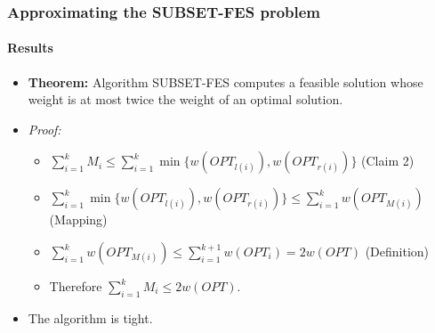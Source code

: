 \documentclass[10pt]{beamer}
\begin{document}
\begin{frame}
    \frametitle{Approximating the SUBSET-FES problem}
    \framesubtitle{Results}
    \begin{itemize}
        \item \textbf{Theorem:} Algorithm SUBSET-FES computes a feasible solution whose weight is at most twice the weight of an optimal solution.
        \item \textit{Proof:}
        \begin{itemize}
            \item \(\sum_{i=1}^{k}M_i \leq \sum_{i=1}^{k} \min\{w(OPT_{l(i)}), w(OPT_{r(i)})\}\) (Claim 2)
            \item \(\sum_{i=1}^{k} \min\{w(OPT_{l(i)}), w(OPT_{r(i)})\} \leq \sum_{i=1}^{k} w(OPT_{M(i)})\) (Mapping)
            \item \(\sum_{i=1}^{k} w(OPT_{M(i)}) \leq \sum_{i=1}^{k+1} w(OPT_i) = 2w(OPT)\)  (Definition)
            \item Therefore \(\sum_{i=1}^{k}M_i \leq 2w(OPT)\).
        \end{itemize}
        \item The algorithm is tight.
    \end{itemize}
\end{frame}
\end{document}
